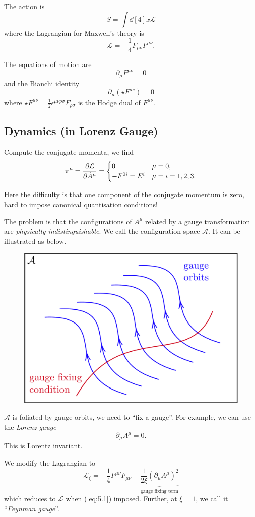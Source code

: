 \documentclass[a4paper,11pt]{article}
\begin{document}
	The action is 
	\[
		S = \int \dd[4]{x} \mathcal{L}
	\]
	where the Lagrangian for Maxwell's theory is
	\[
		\mathcal{L} = - \frac{1}{4} F _{\mu \nu} F ^{\mu \nu}.
	\]
	
	The equations of motion are
	\[
		\partial_\mu F ^{\mu \nu} = 0
	\]
	and the Bianchi identity
	\[
		\partial_\mu (\star F ^{\mu \nu}) = 0
	\]
	where $\star F ^{\mu \nu} = \frac{1}{2} \epsilon ^{\mu \nu \rho \sigma} F _{\rho \sigma}$ is the Hodge dual of $F ^{\mu \nu}$.

	\subsection{Dynamics (in Lorenz Gauge)}
	Compute the conjugate momenta, we find
	\[
		\pi^\mu = \pdv{\mathcal{L}}{\dot A^\mu} = \begin{cases}
			0 & \mu = 0,\\
			- F ^{0i} = E ^{i} & \mu = i = 1,2,3.
		\end{cases}
	\]

	Here the difficulty is that one component of the conjugate momentum is zero, hard to impose canonical quantisation conditions!

	The problem is that the configurations of $A ^\mu$ related by a gauge transformation are \emph{physically indistinguishable}. We call the configuration space $\mathcal{A}$. It can be illustrated as below.
	
	\begin{figure}[h]
		\centering
		\includegraphics[width=0.5\linewidth]{fig/gauge-fixing.pdf}
	\end{figure}
	
	$\mathcal{A}$ is foliated by gauge orbits, we need to ``fix a gauge''. For example, we can use the \emph{Lorenz gauge}
	\begin{equation}
		\partial_\mu A^\mu = 0.
		\label{eq:5.1}
	\end{equation}
	This is Lorentz invariant.

	We modify the Lagrangian to 
	\[
		\mathcal{L}_\xi = - \frac{1}{4} F ^{\mu \nu} F _{\mu \nu} - \underbrace{\frac{1}{2 \xi} \left( \partial_\mu A^\mu \right)^2}_{\text{gauge fixing term}}
	\]
	which reduces to $\mathcal{L}$ when (\ref{eq:5.1}) imposed. Further, at $\xi = 1$, we call it ``\emph{Feynman gauge}''.
\end{document}
